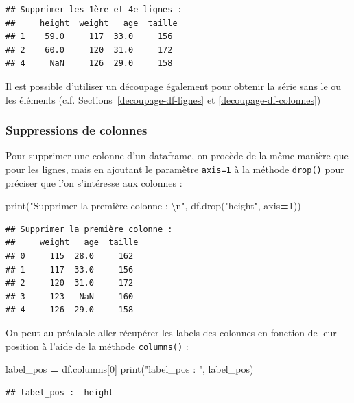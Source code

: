 \documentclass[12pt,]{book}
\newenvironment{Shaded}{\begin{snugshade}}{\end{snugshade}}
\newcommand{\DecValTok}[1]{\textcolor[rgb]{0.00,0.00,0.81}{#1}}
\newcommand{\CharTok}[1]{\textcolor[rgb]{0.31,0.60,0.02}{#1}}
\newcommand{\StringTok}[1]{\textcolor[rgb]{0.31,0.60,0.02}{#1}}
\newcommand{\OperatorTok}[1]{\textcolor[rgb]{0.81,0.36,0.00}{\textbf{#1}}}
\newcommand{\BuiltInTok}[1]{#1}
\newcommand{\NormalTok}[1]{#1}
\numberwithin{equation}{section}
\numberwithin{countremarque}{section}
\begin{document}
\begin{lstlisting}
## Supprimer les 1ère et 4e lignes :  
##     height  weight   age  taille
## 1    59.0     117  33.0     156
## 2    60.0     120  31.0     172
## 4     NaN     126  29.0     158
\end{lstlisting}

Il est possible d'utiliser un découpage également pour obtenir la série
sans le ou les éléments (c.f. Sections~\ref{decoupage-df-lignes} et
\ref{decoupage-df-colonnes})

\subsubsection{Suppressions de colonnes}\label{suppressions-de-colonnes}

Pour supprimer une colonne d'un dataframe, on procède de la même manière
que pour les lignes, mais en ajoutant le paramètre \texttt{axis=1} à la
méthode \texttt{drop()} pour préciser que l'on s'intéresse aux colonnes
:

\begin{Shaded}
\begin{Highlighting}[]
\BuiltInTok{print}\NormalTok{(}\StringTok{"Supprimer la première colonne :  }\CharTok{\textbackslash{}n}\StringTok{"}\NormalTok{, df.drop(}\StringTok{"height"}\NormalTok{, axis}\OperatorTok{=}\DecValTok{1}\NormalTok{))}
\end{Highlighting}
\end{Shaded}

\begin{lstlisting}
## Supprimer la première colonne :  
##     weight   age  taille
## 0     115  28.0     162
## 1     117  33.0     156
## 2     120  31.0     172
## 3     123   NaN     160
## 4     126  29.0     158
\end{lstlisting}

On peut au préalable aller récupérer les labels des colonnes en fonction
de leur position à l'aide de la méthode \texttt{columns()} :

\begin{Shaded}
\begin{Highlighting}[]
\NormalTok{label_pos }\OperatorTok{=}\NormalTok{ df.columns[}\DecValTok{0}\NormalTok{]}
\BuiltInTok{print}\NormalTok{(}\StringTok{"label_pos : "}\NormalTok{, label_pos)}
\end{Highlighting}
\end{Shaded}

\begin{lstlisting}
## label_pos :  height
\end{lstlisting}
\end{document}
